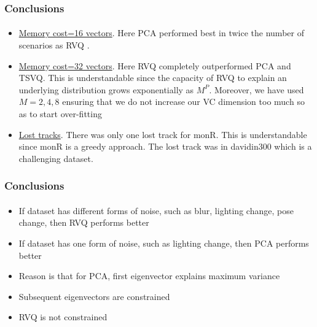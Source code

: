 \begin{frame}
\frametitle{Conclusions}
\framesubtitle{}
\mypagenum
\begin{itemize}
\item \underline{Memory cost=16 vectors}.  Here PCA performed best in twice the number of scenarios as RVQ .
\item \underline{Memory cost=32 vectors}.  Here RVQ completely outperformed PCA and TSVQ.  This is understandable since the capacity of RVQ to explain an underlying distribution grows exponentially as $M^P$.  Moreover, we have used $M=2, 4, 8$ ensuring that we do not increase our VC dimension too much so as to start over-fitting
\item \underline{Lost tracks}.  There was only one lost track for monR.  This is understandable since monR is a greedy approach.  The lost track was in davidin300 which is a challenging dataset.
\end{itemize}
\end{frame}

\begin{frame}
\frametitle{Conclusions}
\framesubtitle{}
\mypagenum
\begin{itemize}
\item If dataset has different forms of noise, such as blur, lighting change, pose change, then RVQ performs better
\item If dataset has one form of noise, such as lighting change, then PCA performs better
\item Reason is that for PCA, first eigenvector explains maximum variance
\item Subsequent eigenvectors are constrained
\item RVQ is not constrained
\end{itemize}
\end{frame}



